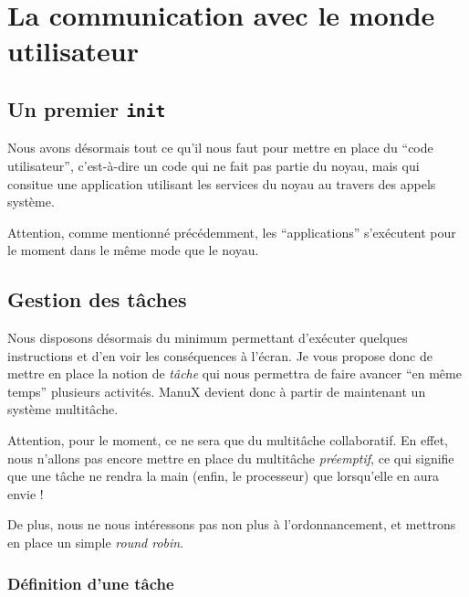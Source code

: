 \documentclass{book}
\begin{document}
\chapter{La communication avec le monde utilisateur}


%
\section{Un premier {\tt init}}

   Nous avons désormais tout ce qu'il nous faut pour mettre en place
du ``code utilisateur'', c'est-à-dire un code qui ne fait pas partie
du noyau, mais qui consitue une application utilisant les services du
noyau au travers des appels système.

   Attention, comme mentionné précédemment, les ``applications''
s'exécutent pour le moment dans le même mode que le noyau.

\section{Gestion des tâches}

   Nous disposons désormais du minimum permettant d'exécuter quelques
instructions et d'en voir les conséquences à l'écran. Je vous propose
donc de mettre en place la notion de {\em tâche} qui nous permettra de
faire avancer ``en même temps'' plusieurs activités. ManuX devient
donc à partir de maintenant un système multitâche.

   Attention, pour le moment, ce ne sera que du multitâche
collaboratif. En effet, nous n'allons pas encore mettre en place du
multitâche {\em préemptif}, ce qui signifie que une tâche ne rendra la
main (enfin, le processeur) que lorsqu'elle en aura envie !

   De plus, nous ne nous intéressons pas non plus à l'ordonnancement,
et mettrons en place un simple {\em round robin}.

\subsection{Définition d'une tâche}
\end{document}
